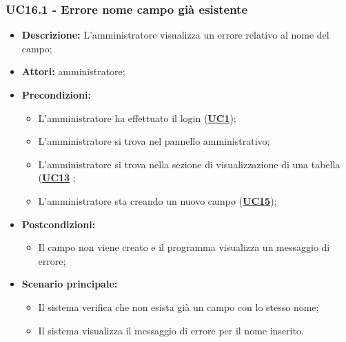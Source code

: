 \subsubsection{UC16.1 - Errore nome campo già esistente}
\label{sec:UC16.1}
\begin{itemize}
	\item \textbf{Descrizione:} L’amministratore visualizza un errore relativo al nome del campo;
	\item \textbf{Attori:} amministratore;
	\item \textbf{Precondizioni:} 
	\begin{itemize}
		\item L’amministratore ha effettuato il login (\hyperref[sec:UC1]{\textbf{UC1}});
		\item L’amministratore si trova nel pannello amministrativo;
		\item L’amministratore si trova nella sezione di visualizzazione di una tabella (\hyperref[sec:UC13]{\textbf{UC13}} ;
		\item L’amministratore sta creando un nuovo campo (\hyperref[sec:UC15]{\textbf{UC15}});
	\end{itemize}
	\item \textbf{Postcondizioni:} 
	\begin{itemize}
		\item Il campo non viene creato e il programma visualizza un messaggio di errore;
	\end{itemize}
	\item \textbf{Scenario principale:} 
	\begin{itemize}
		\item Il sistema verifica che non esista già un campo con lo stesso nome;
		\item Il sistema visualizza il messaggio di errore per il nome inserito.
	\end{itemize}
\end{itemize}


